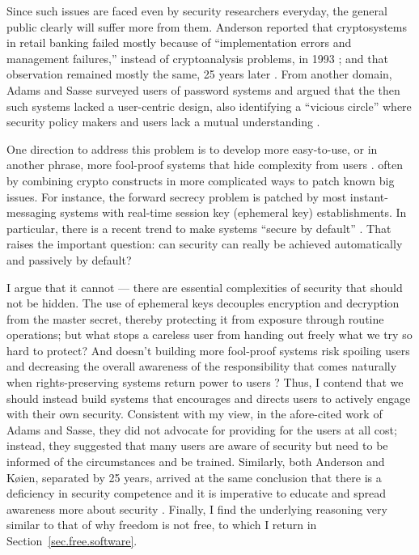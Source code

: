 \documentclass[10pt]{article}
\begin{document}
Since such issues are faced even by security researchers everyday, the general
public clearly will suffer more from them. Anderson reported that cryptosystems
in retail banking failed mostly because of ``implementation errors and
management failures,'' instead of cryptoanalysis problems, in 1993
\cite{anderson.why.cryptosys.fail}; and that observation remained mostly the
same, 25 years later \cite{why.cryptosys.fail.revisit}. From another domain,
Adams and Sasse surveyed users of password systems and argued that the
then such systems lacked a user-centric design, also identifying a ``vicious
circle'' where security policy makers and users lack a mutual understanding
\cite{users.are.not.the.enemy}. 

One direction to address this problem is to develop more easy-to-use, or in
another phrase, more fool-proof systems that hide complexity from users
\cite{secure.systems.people.can.use}. often by combining crypto constructs in
more complicated ways to patch known big issues.  For instance, the forward
secrecy problem is patched by most instant-messaging systems with real-time
session key (ephemeral key) establishments.  In particular, there is a recent
trend to make systems ``secure by default'' \cite{secure.by.default}. That
raises the important question: can security can really be achieved
automatically and passively by default?

I argue that it cannot --- there are essential complexities of security that
should not be hidden. The use of ephemeral keys decouples encryption and
decryption from the master secret, thereby protecting it from exposure through
routine operations; but what stops a careless user from handing out freely what
we try so hard to protect? And doesn't building more fool-proof systems risk
spoiling users and decreasing the overall awareness of the responsibility that
comes naturally when rights-preserving systems return power to users
\cite{usable.security.contradiction, rid.of.usability.sec.tradeoff}?  Thus, I
contend that we should instead build systems that encourages and directs
users to actively engage with their own security. Consistent with my view,
in the afore-cited work of Adams and Sasse, they did not advocate for providing
for the users at all cost; instead, they suggested that many users are aware of
security but need to be informed of the circumstances and be trained.
Similarly, both Anderson and K\o ien, separated by 25 years, arrived at the
same conclusion that there is a deficiency in security competence and it is
imperative to educate and spread awareness more about security
\cite{anderson.why.cryptosys.fail, users.are.not.the.enemy}. Finally, I find
the underlying reasoning very similar to that of why freedom is not free, to
which I return in Section~\ref{sec.free.software}.
\end{document}
